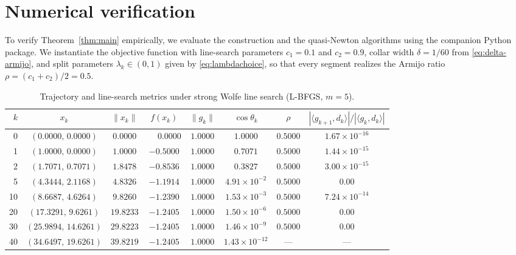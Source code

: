 \documentclass[11pt]{article}
\newcommand{\ip}[2]{\langle #1,#2\rangle}
\begin{document}
\section{Numerical verification}
\label{sec:numerical}

To verify Theorem~\ref{thm:main} empirically, we evaluate the construction and the quasi-Newton algorithms using the companion Python package.
We instantiate the objective function with line-search parameters $c_1 = 0.1$ and $c_2 = 0.9$, collar width $\delta = 1/60$ from \eqref{eq:delta-armijo}, and split parameters $\lambda_k \in (0, 1)$ given by \eqref{eq:lambdachoice}, so that every segment realizes the Armijo ratio $\rho = (c_1 + c_2)/2 = 0.5$.

\begin{table}[htbp]
\centering
\small
\caption{Trajectory and line-search metrics under strong Wolfe line search (L-BFGS, $m = 5$).}
\label{tab:numerical}
\begin{tabular}{rccccccc}
\hline
$k$ & $x_k$ & $\|x_k\|$ & $f(x_k)$ & $\|g_k\|$ & $\cos\theta_k$ & $\rho$ & $|\ip{g_{k+1}}{d_k}| / |\ip{g_k}{d_k}|$ \\
\hline
0  & $(0.0000,\, 0.0000)$   & $0.0000$ & $\phantom{-}0.0000$ & $1.0000$ & $1.0000$              & $0.5000$ & $1.67 \times 10^{-16}$ \\
1  & $(1.0000,\, 0.0000)$   & $1.0000$ & $-0.5000$           & $1.0000$ & $0.7071$              & $0.5000$ & $1.44 \times 10^{-15}$ \\
2  & $(1.7071,\, 0.7071)$   & $1.8478$ & $-0.8536$           & $1.0000$ & $0.3827$              & $0.5000$ & $3.00 \times 10^{-15}$ \\
5  & $(4.3444,\, 2.1168)$   & $4.8326$ & $-1.1914$           & $1.0000$ & $4.91 \times 10^{-2}$ & $0.5000$ & $0.00$ \\
10 & $(8.6687,\, 4.6264)$   & $9.8260$ & $-1.2390$           & $1.0000$ & $1.53 \times 10^{-3}$ & $0.5000$ & $7.24 \times 10^{-14}$ \\
20 & $(17.3291,\, 9.6261)$  & $19.8233$& $-1.2405$           & $1.0000$ & $1.50 \times 10^{-6}$ & $0.5000$ & $0.00$ \\
30 & $(25.9894,\, 14.6261)$ & $29.8223$& $-1.2405$           & $1.0000$ & $1.46 \times 10^{-9}$ & $0.5000$ & $0.00$ \\
40 & $(34.6497,\, 19.6261)$ & $39.8219$& $-1.2405$           & $1.0000$ & $1.43 \times 10^{-12}$& ---      & --- \\
\hline
\end{tabular}
\end{table}
\end{document}
